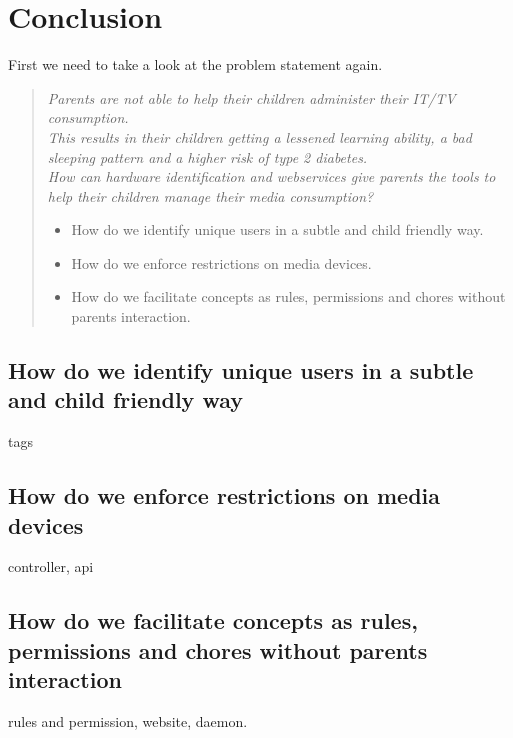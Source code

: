 \chapter{Conclusion}


First we need to take a look at the problem statement again.
\begin{verse}
\textit{Parents are not able to help their children administer their IT/TV consumption.\\
This results in their children getting a lessened learning ability, a bad sleeping pattern and a higher risk of type 2 diabetes.\\
How can hardware identification and webservices give parents the tools to help their children manage their media consumption?}
	\begin{itemize}
		\item How do we identify unique users in a subtle and child friendly way.
		\item How do we enforce restrictions on media devices.
		\item How do we facilitate concepts as rules, permissions and chores without parents interaction.
	\end{itemize}
\end{verse}

\section{How do we identify unique users in a subtle and child friendly way}
tags

\section{How do we enforce restrictions on media devices}
controller, api


\section{How do we facilitate concepts as rules, permissions and chores without parents interaction}
rules and permission, website, daemon.